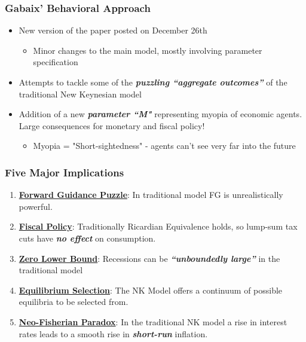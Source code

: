 \documentclass{beamer}
\begin{document}
\begin{frame}
	\frametitle{Gabaix' Behavioral Approach}
	\begin{itemize}
		\item New version of the paper posted on December 26th
		\begin{itemize}
			\item Minor changes to the main model, mostly involving parameter specification
		\end{itemize}
		\vspace{8pt}
		\item Attempts to tackle some of the \textit{\textbf{puzzling ``aggregate outcomes''}} of the traditional New Keynesian model
		\vspace{8pt}
		\item Addition of a new \textit{\textbf{parameter ``M"}} representing myopia of economic agents. Large consequences for monetary and fiscal policy!
		\vspace{8pt}
		\begin{itemize}
			\item Myopia = "Short-sightedness" - agents can't see very far into the future
		\end{itemize}
	\end{itemize}
\end{frame}


\begin{frame}
	\frametitle{Five Major Implications}
	\begin{enumerate}
		\item \textbf{\underline{Forward Guidance Puzzle}}: In traditional model FG is unrealistically powerful.
		\vspace{8pt}
		\item \textbf{\underline{Fiscal Policy}}: Traditionally Ricardian Equivalence holds, so lump-sum tax cuts have \textit{\textbf{no effect}} on consumption.
		\vspace{8pt}
		\item \textbf{\underline{Zero Lower Bound}}: Recessions can be \textit{\textbf{``unboundedly large''}} in the traditional model
		\vspace{8pt}
		\item \textbf{\underline{Equilibrium Selection}}: The NK Model offers a continuum of possible equilibria to be selected from.
		\vspace{8pt}
		\item \underline{\textbf{Neo-Fisherian Paradox}}: In the traditional NK model a rise in interest rates leads to a smooth rise in \textit{\textbf{short-run}} inflation.
	\end{enumerate}
\end{frame}
\end{document}
